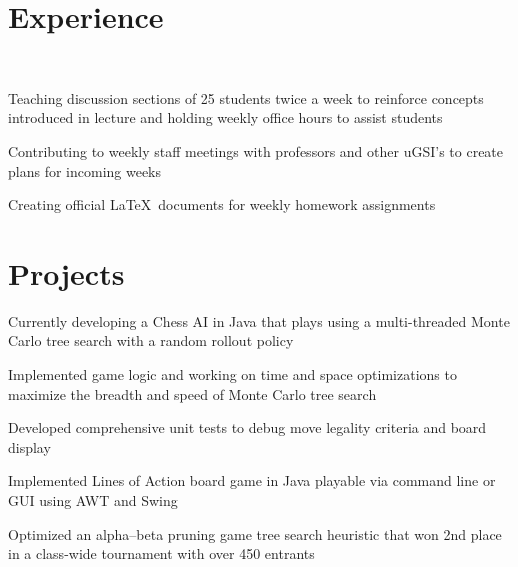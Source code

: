\documentclass[]{deedy-resume-openfont}
\begin{document}
\begin{minipage}[t]{0.66\textwidth} 


\section{Experience}

 \\
\vspace{\topsep} %
\begin{tightemize}
\item Teaching discussion sections of 25 students twice a week to reinforce concepts introduced in lecture and holding weekly office hours to assist students
\item Contributing to weekly staff meetings with professors and other uGSI’s to create plans for incoming weeks
\item  Creating official \LaTeX \ documents for weekly homework assignments
\end{tightemize}
\sectionsep


\section{Projects}
\begin{tightemize}
\item Currently developing a Chess AI in Java that plays using a multi-threaded Monte Carlo tree search with a random rollout policy
\item Implemented game logic and working on time and space optimizations to maximize the breadth and speed of Monte Carlo tree search
\item Developed comprehensive unit tests to debug move legality criteria and board display
\end{tightemize}
\sectionsep

\begin{tightemize}
\item Implemented Lines of Action board game in Java playable via command line or GUI using AWT and Swing
\item Optimized an alpha–beta pruning game tree search heuristic that won 2nd place in a class-wide tournament with over 450 entrants
\end{tightemize}
\sectionsep


\end{minipage}
\end{document}
